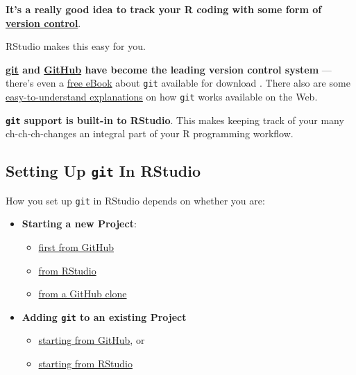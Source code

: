 \documentclass[]{book}
\providecommand{\tightlist}{%
  \setlength{\itemsep}{0pt}\setlength{\parskip}{0pt}}
\theoremstyle{definition}
\theoremstyle{definition}
\theoremstyle{definition}
\theoremstyle{remark}
\begin{document}
\textbf{It's a really good idea to track your R coding with some form of
\href{https://support.rstudio.com/hc/en-us/articles/200532077-Version-Control-with-Git-and-SVN}{version
control}}.

RStudio makes this easy for you.

\textbf{\href{https://git-scm.com/}{git} and
\href{https://github.com/explore}{GitHub} have become the leading
version control system} --- there's even a
\href{https://git-scm.com/book/en/v2}{free eBook} about \texttt{git}
available for download . There also are some
\href{https://r-bio.github.io/intro-git-rstudio/}{easy-to-understand
explanations} on how \texttt{git} works available on the Web.

\textbf{\texttt{git} support is built-in to RStudio}. This makes keeping
track of your many ch-ch-ch-changes an integral part of your R
programming workflow.

\hypertarget{setting-up-git-in-rstudio}{%
\subsection{\texorpdfstring{Setting Up \texttt{git} In
RStudio}{Setting Up git In RStudio}}\label{setting-up-git-in-rstudio}}

How you set up \texttt{git} in RStudio depends on whether you are:

\begin{itemize}
\tightlist
\item
  \textbf{Starting a new Project}:

  \begin{itemize}
  \tightlist
  \item
    \href{http://happygitwithr.com/new-github-first.html}{first from
    GitHub}
  \item
    \href{https://support.rstudio.com/hc/en-us/articles/200532077-Version-Control-with-Git-and-SVN}{from
    RStudio}
  \item
    \href{http://happygitwithr.com/clone.html}{from a GitHub clone}
  \end{itemize}
\item
  \textbf{Adding \texttt{git} to an existing Project}

  \begin{itemize}
  \tightlist
  \item
    \href{http://happygitwithr.com/existing-github-first.html}{starting
    from GitHub}, or
  \item
    \href{http://happygitwithr.com/existing-github-last.html}{starting
    from RStudio}
  \end{itemize}
\end{itemize}
\end{document}
